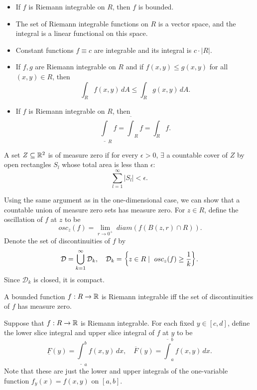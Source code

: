 \begin{prop}
    \begin{itemize}
        \item If $f$ is Riemann integrable on $R$, then $f$ is bounded.
        \item The set of Riemann integrable functions on $R$ is a vector space, and the integral is a linear functional on this space.
        \item Constant functions $f \equiv c$ are integrable and its integral is $c \cdot |R|$.
        \item If $f, g$ are Riemann integrable on $R$ and if $f(x, y) \leq g(x, y)$ for all $(x, y) \in R$, then
        \[
        \int_R f(x, y) \, dA \leq \int_R g(x, y) \, dA.
        \]
        \item If $f$ is Riemann integrable on $R$, then
        \[
        \underline{\int}_R f = \overline{\int}_R f = \int_R f.
        \]
    \end{itemize}
\end{prop}

\begin{df}
    A set $Z \subseteq {\mathbb R}^2$ is of measure zero if for every $\epsilon > 0$, $\exists$ a countable cover of $Z$ by open rectangles $S_l$ whose total area is less than $\epsilon$:
    \[
    \sum_{l=1}^\infty |S_l| < \epsilon.
    \]
\end{df}

Using the same argument as in the one-dimensional case, we can show that a countable union of measure zero sets has measure zero. For $z \in R$, define the oscillation of $f$ at $z$ to be
\[
~osc_z(f) = \lim_{r \to 0^+} ~diam(f(B(z, r) \cap R)).
\]
Denote the set of discontinuities of $f$ by
\[
\mathcal D = \bigcup_{k=1}^\infty \mathcal D_k, \quad \mathcal D_k = {\left\{{z \in R \mid ~osc_z(f) \geq \frac1k}\right\}}.
\]
Since $\mathcal D_k$ is closed, it is compact.

\begin{thm}
    A bounded function $f: R \to {\mathbb R}$ is Riemann integrable iff the set of discontinuities of $f$ has measure zero.
\end{thm}

Suppose that $f: R \to {\mathbb R}$ is Riemann integrable. For each fixed $y \in [c, d]$, define the lower slice integral and upper slice integral of $f$ at $y$ to be
\[
\underline{F}(y) = \underline{\int}_a^b f(x, y) \, dx, \quad \overline{F}(y) = \overline{\int}_a^b f(x, y) \, dx.
\]
Note that these are just the lower and upper integrals of the one-variable function $f_y(x) = f(x, y)$ on $[a, b]$.

